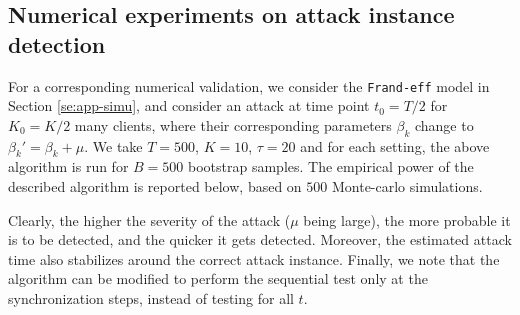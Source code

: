 \documentclass[a4paper,11pt]{article}
\numberwithin{equation}{section}
\theoremstyle{plain}
\theoremstyle{remark}
\begin{document}
\subsection{Numerical experiments on attack instance detection} \label{se:attack-simu}

For a corresponding numerical validation, we consider the \texttt{Frand-eff} model in Section \ref{se:app-simu}, and consider an attack at time point $t_0 = T/2$ for $K_0=K/2$ many clients, where their corresponding parameters $\beta_k$ change to $\beta_k' = \beta_k + \mu$. We take $T=500$, $K=10$, $\tau=20$ and for each setting, the above algorithm is run for $B=500$ bootstrap samples. The empirical power of the described algorithm is reported below, based on $500$ Monte-carlo simulations.

\begin{table}[H]
\centering
{}
\caption{Simulation results of attack detection.}
\end{table}
Clearly, the higher the severity of the attack ($\mu$ being large), the more probable it is to be detected, and the quicker it gets detected. Moreover, the estimated attack time also stabilizes around the correct attack instance. Finally, we note that the algorithm can be modified to perform the sequential test only at the synchronization steps, instead of testing for all $t$. 
\end{document}
